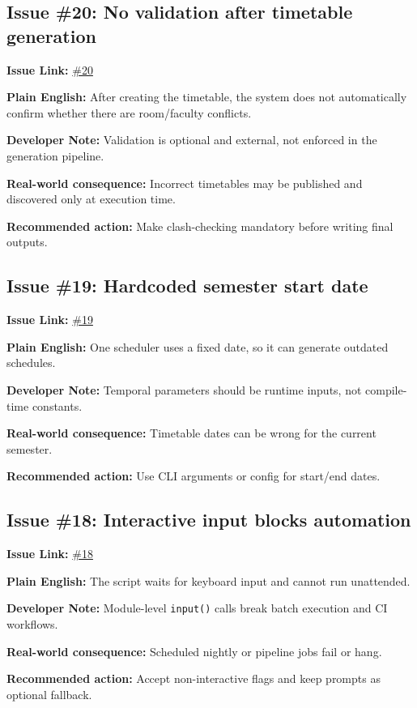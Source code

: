 \documentclass[12pt,a4paper]{article}
\begin{document}
\subsection*{Issue \#20: No validation after timetable generation}
\textbf{Issue Link:} \href{https://github.com/ArnavBallinCode/TimetableIIITDWD/issues/20}{\#20}

\textbf{Plain English:} After creating the timetable, the system does not automatically confirm whether there are room/faculty conflicts.

\textbf{Developer Note:} Validation is optional and external, not enforced in the generation pipeline.

\textbf{Real-world consequence:} Incorrect timetables may be published and discovered only at execution time.

\textbf{Recommended action:} Make clash-checking mandatory before writing final outputs.

\subsection*{Issue \#19: Hardcoded semester start date}
\textbf{Issue Link:} \href{https://github.com/ArnavBallinCode/TimetableIIITDWD/issues/19}{\#19}

\textbf{Plain English:} One scheduler uses a fixed date, so it can generate outdated schedules.

\textbf{Developer Note:} Temporal parameters should be runtime inputs, not compile-time constants.

\textbf{Real-world consequence:} Timetable dates can be wrong for the current semester.

\textbf{Recommended action:} Use CLI arguments or config for start/end dates.

\subsection*{Issue \#18: Interactive input blocks automation}
\textbf{Issue Link:} \href{https://github.com/ArnavBallinCode/TimetableIIITDWD/issues/18}{\#18}

\textbf{Plain English:} The script waits for keyboard input and cannot run unattended.

\textbf{Developer Note:} Module-level \texttt{input()} calls break batch execution and CI workflows.

\textbf{Real-world consequence:} Scheduled nightly or pipeline jobs fail or hang.

\textbf{Recommended action:} Accept non-interactive flags and keep prompts as optional fallback.
\end{document}
